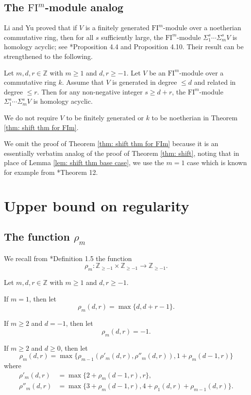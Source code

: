 \documentclass{amsart}
\numberwithin{equation}{section}
\newcommand{\FI}{{\mathrm{FI}}}
\newcommand{\ZZ}{{\mathbb{Z}_{\geqslant -1}}}
\begin{document}
\subsection{The $\FI^m$-module analog}
Li and Yu proved that if $V$ is a finitely generated $\FI^m$-module over a noetherian commutative ring, then for all $s$ sufficiently large, the $\FI^m$-module $\Sigma_1^s \cdots \Sigma_m^s V$ is homology acyclic; see  \cite{liyu}*{Proposition 4.4 and Proposition 4.10}. Their result can be strengthened to the following.

\begin{theorem} \label{thm: shift thm for FIm}
   Let $m,d,r\in\mathbb{Z}$ with $m\geqslant 1$ and $d, r\geqslant -1$. Let $V$ be an $\FI^m$-module over a commutative ring $k$. Assume that $V$ is generated in degree $\leqslant d$ and related in degree $\leqslant r$. Then for any non-negative integer $s\geqslant d+r$, the $\FI^m$-module $\Sigma_1^s \cdots \Sigma_m^s V$ is homology acyclic.
\end{theorem}

We do not require $V$ to be finitely generated or $k$ to be noetherian in Theorem \ref{thm: shift thm for FIm}.

We omit the proof of Theorem \ref{thm: shift thm for FIm} because it is an essentially verbatim analog of the proof of Theorem \ref{thm: shift}, noting that in place of Lemma \ref{lem: shift thm base case}, we use the $m=1$ case which is known for example from \cite{gan}*{Theorem 12}. 




\section{Upper bound on regularity} \label{sec: upper bound}

\subsection{The function $\rho_m$}
We recall from \cite{gta}*{Definition 1.5} the function 
\[ \rho_m: \ZZ \times \ZZ \to \ZZ. \] 

\begin{definition} \label{def:rho}
   Let $m,d,r\in\mathbb{Z}$ with $m\geqslant 1$ and $d, r\geqslant -1$.

   If $m=1$, then let
   \[ \rho_m(d,r) = \max\{d, d+r-1\}. \]

   If $m\geqslant 2$ and $d=-1$, then let 
   \[ \rho_m(d,r) = -1. \]
   
   If $m\geqslant 2$ and $d\geqslant 0$, then let 
   \[ \rho_m(d,r) = \max\{ \rho_{m-1}(\rho'_m(d,r), \rho''_m(d,r)), 1+\rho_m(d-1,r) \} \]
   where 
   \begin{align*}
      \rho'_m(d,r) &= \max\{ 2+\rho_m(d-1, r), r \}  ,\\
      \rho''_m(d,r) &=  \max\{ 3+\rho_m(d-1, r), 4+ \rho_1(d,r) + \rho_{m-1}(d,r) \}.
   \end{align*}
\end{definition}
\end{document}

